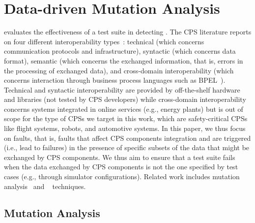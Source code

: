 
\section{Data-driven Mutation Analysis}
\label{sec:background}

 evaluates the effectiveness of a test suite in detecting . The CPS literature reports on four different interoperability types~\cite{Givehchi:2017}: technical (which concerns communication protocols and  infrastructure), syntactic (which concerns data format), semantic (which concerns the exchanged information, that is, errors in the processing of exchanged data), and cross-domain interoperability (which concerns interaction through business process languages such as BPEL~\cite{BPEL}).
Technical and syntactic interoperability are provided by off-the-shelf hardware and libraries
(not tested by CPS developers) 
 while cross-domain interoperability concerns systems integrated in online services (e.g., energy plants) but is out of scope for the type of CPSs we target in this work, which are safety-critical CPSs like flight systems, robots, and automotive systems. In this paper, we thus focus on  faults,
 that is, faults that affect CPS components integration and are triggered (i.e., lead to failures) in the presence of specific subsets of the data that might be exchanged by CPS components. We thus aim to ensure that a test suite fails when the data exchanged by CPS components is not the one specified by test cases (e.g., through simulator configurations).
Related work includes mutation analysis~\cite{jia2010analysis,papadakis2019mutation} and ~\cite{natella2016assessing} techniques.

\subsection{Mutation Analysis}



